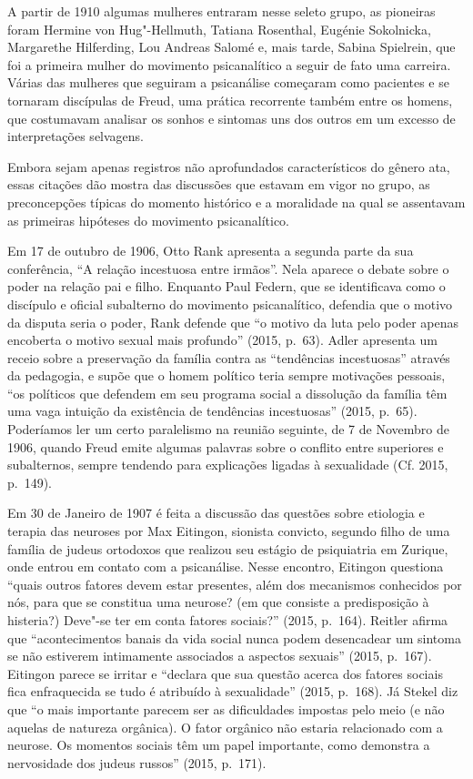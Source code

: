 A partir de 1910 algumas mulheres entraram nesse seleto grupo, as
pioneiras foram Hermine von Hug"-Hellmuth, Tatiana Rosenthal, Eugénie
Sokolnicka, Margarethe Hilferding, Lou Andreas Salomé e, mais tarde,
Sabina Spielrein, que foi a primeira mulher do movimento psicanalítico a
seguir de fato uma carreira. Várias das mulheres que seguiram a
psicanálise começaram como pacientes e se tornaram discípulas de Freud,
uma prática recorrente também entre os homens, que costumavam analisar
os sonhos e sintomas uns dos outros em um excesso de interpretações
selvagens.

Embora sejam apenas registros não aprofundados característicos do gênero
ata, essas citações dão mostra das discussões que estavam em vigor no
grupo, as preconcepções típicas do momento histórico e a moralidade na
qual se assentavam as primeiras hipóteses do movimento psicanalítico.

Em 17 de outubro de 1906, Otto Rank apresenta a segunda parte da sua
conferência, ``A relação incestuosa entre irmãos''. Nela aparece o
debate sobre o poder na relação pai e filho. Enquanto Paul Federn, que
se identificava como o discípulo e oficial subalterno do movimento
psicanalítico, defendia que o motivo da disputa seria o poder, Rank
defende que ``o motivo da luta pelo poder apenas encoberta o motivo
sexual mais profundo'' (2015, p.~63). Adler apresenta um receio sobre a
preservação da família contra as ``tendências incestuosas'' através da
pedagogia, e supõe que o homem político teria sempre motivações
pessoais, ``os políticos que defendem em seu programa social a dissolução
da família têm uma vaga intuição da existência de tendências
incestuosas'' (2015, p.~65). Poderíamos ler um certo paralelismo na
reunião seguinte, de 7 de Novembro de 1906, quando Freud emite algumas
palavras sobre o conflito entre superiores e subalternos, sempre
tendendo para explicações ligadas à sexualidade (Cf. 2015, p.~149).

Em 30 de Janeiro de 1907 é feita a discussão das questões sobre
etiologia e terapia das neuroses por Max Eitingon, sionista convicto,
segundo filho de uma família de judeus ortodoxos que realizou seu
estágio de psiquiatria em Zurique, onde entrou em contato com a
psicanálise. Nesse encontro, Eitingon questiona ``quais outros fatores
devem estar presentes, além dos mecanismos conhecidos por nós, para que
se constitua uma neurose? (em que consiste a predisposição à histeria?)
Deve"-se ter em conta fatores sociais?'' (2015, p.~164). Reitler afirma
que ``acontecimentos banais da vida social nunca podem desencadear um
sintoma se não estiverem intimamente associados a aspectos sexuais''
(2015, p.~167). Eitingon parece se irritar e ``declara que sua questão
acerca dos fatores sociais fica enfraquecida se tudo é atribuído à
sexualidade'' (2015, p.~168). Já Stekel diz que ``o mais importante
parecem ser as dificuldades impostas pelo meio (e não aquelas de
natureza orgânica). O fator orgânico não estaria relacionado com a
neurose. Os momentos sociais têm um papel importante, como demonstra a
nervosidade dos judeus russos'' (2015, p.~171).

